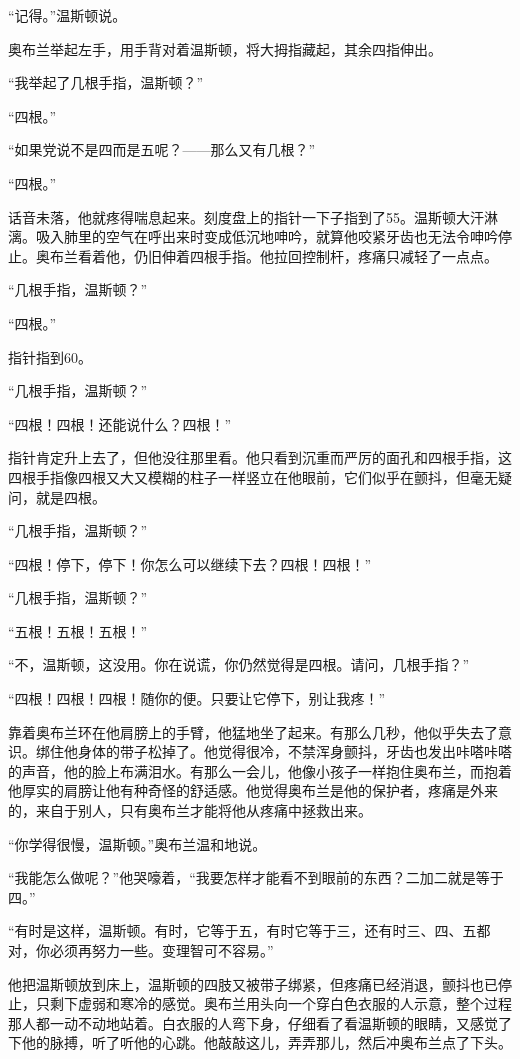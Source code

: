 ``记得。''温斯顿说。

奥布兰举起左手，用手背对着温斯顿，将大拇指藏起，其余四指伸出。

``我举起了几根手指，温斯顿？''

``四根。''

``如果党说不是四而是五呢？------那么又有几根？''

``四根。''

话音未落，他就疼得喘息起来。刻度盘上的指针一下子指到了55。温斯顿大汗淋漓。吸入肺里的空气在呼出来时变成低沉地呻吟，就算他咬紧牙齿也无法令呻吟停止。奥布兰看着他，仍旧伸着四根手指。他拉回控制杆，疼痛只减轻了一点点。

``几根手指，温斯顿？''

``四根。''

指针指到60。

``几根手指，温斯顿？''

``四根！四根！还能说什么？四根！''

指针肯定升上去了，但他没往那里看。他只看到沉重而严厉的面孔和四根手指，这四根手指像四根又大又模糊的柱子一样竖立在他眼前，它们似乎在颤抖，但毫无疑问，就是四根。

``几根手指，温斯顿？''

``四根！停下，停下！你怎么可以继续下去？四根！四根！''

``几根手指，温斯顿？''

``五根！五根！五根！''

``不，温斯顿，这没用。你在说谎，你仍然觉得是四根。请问，几根手指？''

``四根！四根！四根！随你的便。只要让它停下，别让我疼！''

靠着奥布兰环在他肩膀上的手臂，他猛地坐了起来。有那么几秒，他似乎失去了意识。绑住他身体的带子松掉了。他觉得很冷，不禁浑身颤抖，牙齿也发出咔嗒咔嗒的声音，他的脸上布满泪水。有那么一会儿，他像小孩子一样抱住奥布兰，而抱着他厚实的肩膀让他有种奇怪的舒适感。他觉得奥布兰是他的保护者，疼痛是外来的，来自于别人，只有奥布兰才能将他从疼痛中拯救出来。

``你学得很慢，温斯顿。''奥布兰温和地说。

``我能怎么做呢？''他哭嚎着，``我要怎样才能看不到眼前的东西？二加二就是等于四。''

``有时是这样，温斯顿。有时，它等于五，有时它等于三，还有时三、四、五都对，你必须再努力一些。变理智可不容易。''

他把温斯顿放到床上，温斯顿的四肢又被带子绑紧，但疼痛已经消退，颤抖也已停止，只剩下虚弱和寒冷的感觉。奥布兰用头向一个穿白色衣服的人示意，整个过程那人都一动不动地站着。白衣服的人弯下身，仔细看了看温斯顿的眼睛，又感觉了下他的脉搏，听了听他的心跳。他敲敲这儿，弄弄那儿，然后冲奥布兰点了下头。


